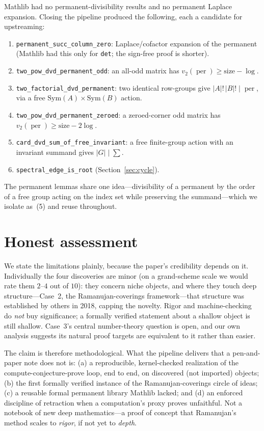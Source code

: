 \documentclass[11pt]{article}
\theoremstyle{remark}\newtheorem{remark}[theorem]{Remark}
\DeclareMathOperator{\perm}{per}
\newcommand{\vtwo}{v_2}
\begin{document}
Mathlib had no permanent-divisibility results and no permanent Laplace expansion.
Closing the pipeline produced the following, each a candidate for upstreaming:
\begin{enumerate}
\item \texttt{permanent\_succ\_column\_zero}: Laplace/cofactor expansion of the
      permanent (Mathlib had this only for \texttt{det}; the sign-free proof is
      shorter).
\item \texttt{two\_pow\_dvd\_permanent\_odd}: an all-odd matrix has
      $\vtwo(\perm)\ge \text{size}-\log$.
\item \texttt{two\_factorial\_dvd\_permanent}: two identical row-groups give
      $|A|!\,|B|! \mid \perm$, via a free $\mathrm{Sym}(A)\times\mathrm{Sym}(B)$
      action.
\item \texttt{two\_pow\_dvd\_permanent\_zeroed}: a zeroed-corner odd matrix has
      $\vtwo(\perm)\ge \text{size}-2\log$.
\item \texttt{card\_dvd\_sum\_of\_free\_invariant}: a free finite-group action with
      an invariant summand gives $|G|\mid\sum$.
\item \texttt{spectral\_edge\_is\_root} (Section~\ref{sec:cycle}).
\end{enumerate}
The permanent lemmas share one idea---divisibility of a permanent by the order of a
free group acting on the index set while preserving the summand---which we isolate
as~(5) and reuse throughout.

\section{Honest assessment}\label{sec:assessment}

We state the limitations plainly, because the paper's credibility depends on it.
Individually the four discoveries are minor (on a grand-scheme scale we would rate
them $2$--$4$ out of $10$): they concern niche objects, and where they touch deep
structure---Case~2, the Ramanujan-coverings framework---that
structure was established by others in 2018, capping the novelty. Rigor and
machine-checking do \emph{not} buy significance; a formally verified statement
about a shallow object is still shallow. Case~3's central number-theory
question is open, and our own analysis suggests its natural proof targets are
equivalent to it rather than easier.

The claim is therefore methodological. What the pipeline delivers that a
pen-and-paper note does not is: (a) a reproducible, kernel-checked realization of
the compute-conjecture-prove loop, end to end, on discovered (not imported)
objects; (b) the first formally verified instance of the Ramanujan-coverings circle
of ideas; (c) a reusable formal permanent library Mathlib lacked; and (d) an
enforced discipline of retraction when a computation's proxy proves unfaithful.
Not a notebook of new deep mathematics---a proof of concept that Ramanujan's method
scales to \emph{rigor}, if not yet to \emph{depth}.
\end{document}
